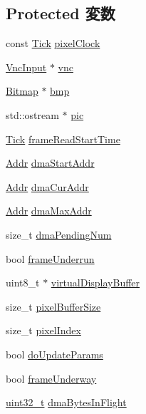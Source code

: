 \subsection*{Protected 変数}
\begin{DoxyCompactItemize}
\item 
const \hyperlink{base_2types_8hh_a5c8ed81b7d238c9083e1037ba6d61643}{Tick} \hyperlink{classHDLcd_a1482911218ac61eabec3de2d904b8274}{pixelClock}
\item 
\hyperlink{classVncInput}{VncInput} $\ast$ \hyperlink{classHDLcd_a52d1b5d3426a30e18a452cd67d87ec13}{vnc}
\item 
\hyperlink{classBitmap}{Bitmap} $\ast$ \hyperlink{classHDLcd_ada429bf89af3356a338f9532d68623cc}{bmp}
\item 
std::ostream $\ast$ \hyperlink{classHDLcd_af724472dcdfb49ce72ef865c101a1c0d}{pic}
\item 
\hyperlink{base_2types_8hh_a5c8ed81b7d238c9083e1037ba6d61643}{Tick} \hyperlink{classHDLcd_a9c95baa754410596ad866c39aba696f4}{frameReadStartTime}
\item 
\hyperlink{base_2types_8hh_af1bb03d6a4ee096394a6749f0a169232}{Addr} \hyperlink{classHDLcd_ae74c38d13416c4966fdd5c7db4678607}{dmaStartAddr}
\item 
\hyperlink{base_2types_8hh_af1bb03d6a4ee096394a6749f0a169232}{Addr} \hyperlink{classHDLcd_afff19aa29c60ac58e1bfa8689c58b923}{dmaCurAddr}
\item 
\hyperlink{base_2types_8hh_af1bb03d6a4ee096394a6749f0a169232}{Addr} \hyperlink{classHDLcd_a49db4d0a53163e636aa5a9e23b93b50c}{dmaMaxAddr}
\item 
size\_\-t \hyperlink{classHDLcd_a4f93e5868d1229f860a8ca2bfeaa5a12}{dmaPendingNum}
\item 
bool \hyperlink{classHDLcd_a2c55466de4118724cb375f5d1c7844e8}{frameUnderrun}
\item 
uint8\_\-t $\ast$ \hyperlink{classHDLcd_af1670e6105cdc695dd52fdde8c18f3e1}{virtualDisplayBuffer}
\item 
size\_\-t \hyperlink{classHDLcd_a77d3768993df37b5ded2ce8a0567db9e}{pixelBufferSize}
\item 
size\_\-t \hyperlink{classHDLcd_a9b265584471f3f05939bd3891884ba23}{pixelIndex}
\item 
bool \hyperlink{classHDLcd_ad49d02ec4064ddf6d7055dcdc6128e20}{doUpdateParams}
\item 
bool \hyperlink{classHDLcd_a36c69169afb7a9e1f41eb2b5fc7516c5}{frameUnderway}
\item 
\hyperlink{Type_8hh_a435d1572bf3f880d55459d9805097f62}{uint32\_\-t} \hyperlink{classHDLcd_afea33d6bd5ce3008fa372e08f27ca95e}{dmaBytesInFlight}

\end{DoxyCompactItemize}
